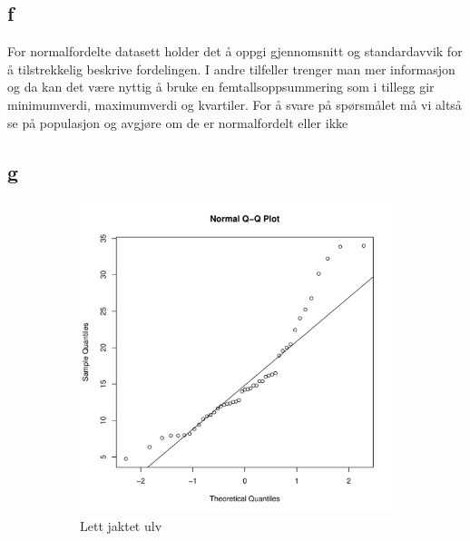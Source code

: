 \subsection*{f}
For normalfordelte datasett holder det å oppgi gjennomsnitt og standardavvik for å tilstrekkelig beskrive fordelingen. I andre tilfeller trenger man mer informasjon og da kan det være nyttig å bruke en femtallsoppsummering som i tillegg gir minimumverdi, maximumverdi og kvartiler.
For å svare på spørsmålet må vi altså se på populasjon og avgjøre om de er normalfordelt eller ikke

\subsection*{g}

\begin{figure}[H]
    \centering
    \begin{subfigure}{0.5\textwidth}
        \centering
        \includegraphics[width=\linewidth]{LETT.pdf}
        \caption{Lett jaktet ulv}
    \end{subfigure}%
    ~
    \begin{subfigure}{0.5\textwidth}
        \centering

\end{subfigure}
\end{figure}
